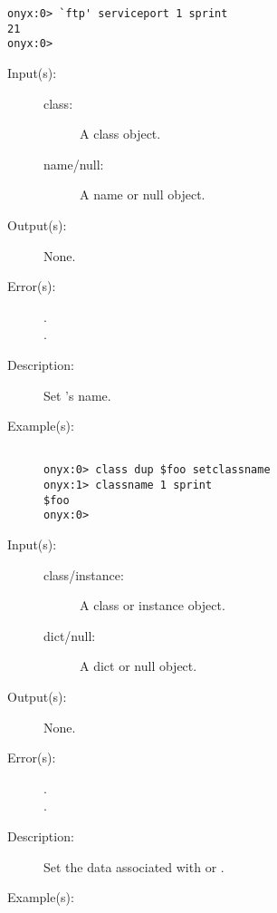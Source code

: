 \begin{description}
\begin{description}
\begin{verbatim}
onyx:0> `ftp' serviceport 1 sprint
21
onyx:0>
		\end{verbatim}
	\end{description}
\label{systemdict:setclassname}
\item[{\onyxop{class name/null}{setclassname}{--}}: ]
	\begin{description}\item[]
	\item[Input(s): ]
		\begin{description}\item[]
		\item[class: ]
			A class object.
		\item[name/null: ]
			A name or null object.
		\end{description}
	\item[Output(s): ] None.
	\item[Error(s): ]
		\begin{description}\item[]
		\item[.]
		\item[.]
		\end{description}
	\item[Description: ]
		Set 's name.
	\item[Example(s): ]\begin{verbatim}

onyx:0> class dup $foo setclassname
onyx:1> classname 1 sprint
$foo
onyx:0>
		\end{verbatim}
	\end{description}
\label{systemdict:setdata}
\item[{\onyxop{class/instance dict/null}{setdata}{--}}: ]
	\begin{description}\item[]
	\item[Input(s): ]
		\begin{description}\item[]
		\item[class/instance: ]
			A class or instance object.
		\item[dict/null: ]
			A dict or null object.
		\end{description}
	\item[Output(s): ] None.
	\item[Error(s): ]
		\begin{description}\item[]
		\item[.]
		\item[.]
		\end{description}
	\item[Description: ]
		Set the data associated with  or .
	\item[Example(s): ]\begin{verbatim}


\end{verbatim}
\end{description}
\end{description}
